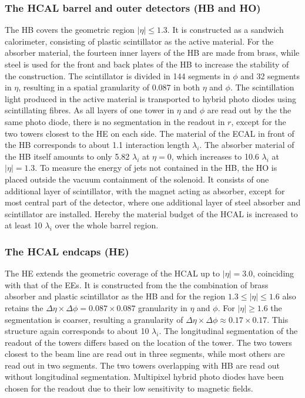 \subsubsection*{The HCAL barrel and outer detectors (HB and HO)}  
The HB covers the geometric region $\vert \eta \vert \leq 1.3$. It is constructed as a sandwich calorimeter, consisting of plastic scintillator as the active material. For the absorber material, the fourteen inner layers of the HB are made from brass, while steel is used for the front and back plates of the HB to increase the stability of the construction. The scintillator is divided in 144 segments in $\phi$ and 32 segments in $\eta$, resulting in a spatial granularity of 0.087 in both $\eta$ and $\phi$. The scintillation light produced in the active material is transported to hybrid photo diodes using scintillating fibres. As all layers of one tower in $\eta$ and $\phi$ are read out by the the same photo diode, there is no segmentation in the readout in $r$, except for the two towers closest to the HE on each side. The material of the ECAL in front of the HB corresponds to about 1.1 interaction length $\lambda_i$. The absorber material of the HB itself amounts to only 5.82 $\lambda_i$ at $\eta = 0$, which increases to 10.6 $\lambda_i$ at $\vert \eta \vert = 1.3$. To measure the energy of jets not contained in the HB, the HO is placed outside the vacuum containment of the solenoid. It consists of one additional layer of scintillator, with the magnet acting as absorber, except for most central part of the detector, where one additional layer of steel absorber and scintillator are installed. Hereby the material budget of the HCAL is increased to at least 10 $\lambda_i$ over the whole barrel region.

\subsubsection*{The HCAL endcaps (HE)}
The HE extends the geometric coverage of the HCAL up to $\vert\eta\vert =3.0$, coinciding with that of the EEs. It is constructed from the the combination of brass absorber and plastic scintillator as the HB and for the region $1.3 \leq \vert\eta\vert \leq 1.6$ also retains the $\Delta\eta \times \Delta \phi = 0.087\times 0.087$ granularity in $\eta$ and $\phi$. For $\vert\eta\vert \geq 1.6$ the segmentation is coarser, resulting a granularity of $\Delta\eta \times \Delta \phi \approx 0.17\times0.17$. This structure again corresponds to about 10 $\lambda_i$. The longitudinal segmentation of the readout of the towers differs based on the location of the tower. The two towers closest to the beam line are read out in three segments, while most others are read out in two segments. The two towers overlapping with HB are read out without longitudinal segmentation. Multipixel hybrid photo diodes have been chosen for the readout due to their low sensitivity to magnetic fields.
